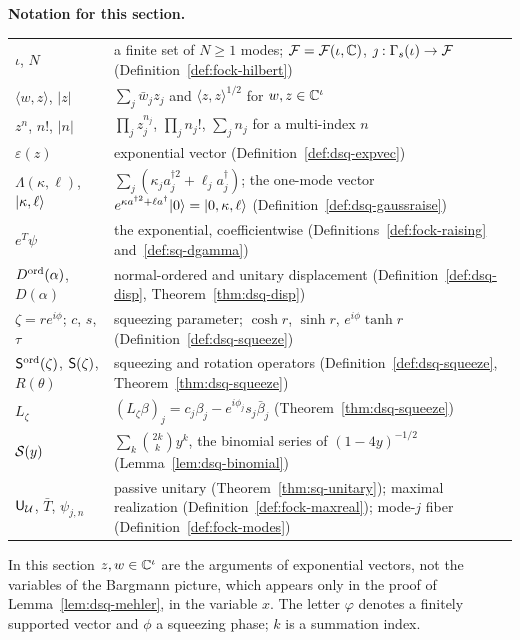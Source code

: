 \begin{veteenv}
\medskip
\noindent\textbf{Notation for this section.}
\begin{center}
\begin{tabular}{@{}L{0.3\textwidth}L{0.64\textwidth}@{}}
$\iota$, $N$ & a finite set of $N\ge1$ modes; $\mathcal F=\mathcal F(\iota,\mathbb C)$, $\jmath:\Gamma_s(\iota)\to\mathcal F$ (Definition~\ref{def:fock-hilbert})\\
$\langle w,z\rangle$, $\lvert z\rvert$ & $\sum_j\bar w_jz_j$ and $\langle z,z\rangle^{1/2}$ for $w,z\in\mathbb C^\iota$\\
$z^n$, $n!$, $\lvert n\rvert$ & $\prod_jz_j^{n_j}$, $\prod_jn_j!$, $\sum_jn_j$ for a multi-index $n$\\
$\varepsilon(z)$ & exponential vector (Definition~\ref{def:dsq-expvec})\\
$\Lambda(\kappa,\ell)$, $\lvert \kappa,\ell\rangle$ & $\sum_j(\kappa_ja_j^{\dagger2}+\ell_ja_j^\dagger)$; the one-mode vector
$e^{\kappa a^{\dagger2}+\ell a^\dagger}\lvert 0\rangle=\lvert 0,\kappa,\ell\rangle$ (Definition~\ref{def:dsq-gaussraise})\\
$e^T\psi$ & the exponential, coefficientwise (Definitions~\ref{def:fock-raising} and~\ref{def:sq-dgamma})\\
$D^{\mathrm{ord}}(\alpha)$, $D(\alpha)$ & normal-ordered and unitary displacement (Definition~\ref{def:dsq-disp},
Theorem~\ref{thm:dsq-disp})\\
$\zeta=re^{i\phi}$; $c$, $s$, $\tau$ & squeezing parameter; $\cosh r$, $\sinh r$, $e^{i\phi}\tanh r$ (Definition~\ref{def:dsq-squeeze})\\
$\mathsf S^{\mathrm{ord}}(\zeta)$, $\mathsf S(\zeta)$, $R(\theta)$ & squeezing and rotation operators (Definition~\ref{def:dsq-squeeze},
Theorem~\ref{thm:dsq-squeeze})\\
$L_\zeta$ & $(L_\zeta\beta)_j=c_j\beta_j-e^{i\phi_j}s_j\bar\beta_j$ (Theorem~\ref{thm:dsq-squeeze})\\
$\mathcal S(y)$ & $\sum_k\binom{2k}ky^k$, the binomial series of $(1-4y)^{-1/2}$ (Lemma~\ref{lem:dsq-binomial})\\
$\mathsf U_\mathcal U$, $\bar T$, $\psi_{j,n}$ & passive unitary (Theorem~\ref{thm:sq-unitary}); maximal realization
(Definition~\ref{def:fock-maxreal}); mode-$j$ fiber (Definition~\ref{def:fock-modes})\\
\end{tabular}
\end{center}
In this section $z,w\in\mathbb C^\iota$ are the arguments of exponential vectors, not the variables of the Bargmann picture,
which appears only in the proof of Lemma~\ref{lem:dsq-mehler}, in the variable $x$. The letter $\varphi$ denotes a finitely supported vector and $\phi$ a squeezing phase; $k$ is a
summation index.


\end{veteenv}
